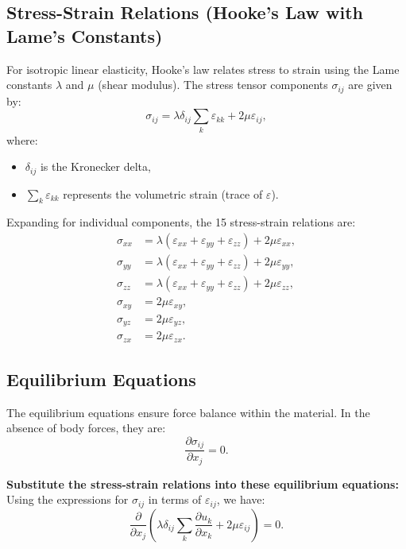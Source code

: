 \documentclass[fleqn,10pt]{olplainarticle}
\begin{document}
\subsection{Stress-Strain Relations (Hooke’s Law with Lame’s Constants)}
For isotropic linear elasticity, Hooke's law relates stress to strain using the Lame constants \(\lambda\) and \(\mu\) (shear modulus). The stress tensor components \(\sigma_{ij}\) are given by:
\begin{equation}
\sigma_{ij} = \lambda \delta_{ij} \sum_{k} \varepsilon_{kk} + 2 \mu \varepsilon_{ij},
\end{equation}
where:
\begin{itemize}
    \item \(\delta_{ij}\) is the Kronecker delta,
    \item \(\sum_{k} \varepsilon_{kk}\) represents the volumetric strain (trace of \(\varepsilon\)).
\end{itemize}

Expanding for individual components, the 15 stress-strain relations are:
\begin{align}
\sigma_{xx} &= \lambda (\varepsilon_{xx} + \varepsilon_{yy} + \varepsilon_{zz}) + 2 \mu \varepsilon_{xx}, \\
\sigma_{yy} &= \lambda (\varepsilon_{xx} + \varepsilon_{yy} + \varepsilon_{zz}) + 2 \mu \varepsilon_{yy}, \\
\sigma_{zz} &= \lambda (\varepsilon_{xx} + \varepsilon_{yy} + \varepsilon_{zz}) + 2 \mu \varepsilon_{zz}, \\
\sigma_{xy} &= 2 \mu \varepsilon_{xy}, \\
\sigma_{yz} &= 2 \mu \varepsilon_{yz}, \\
\sigma_{zx} &= 2 \mu \varepsilon_{zx}.
\end{align}

\subsection{Equilibrium Equations}
The equilibrium equations ensure force balance within the material. In the absence of body forces, they are:
\begin{equation}
\frac{\partial \sigma_{ij}}{\partial x_j} = 0.
\end{equation}

\textbf{Substitute the stress-strain relations into these equilibrium equations:} Using the expressions for \(\sigma_{ij}\) in terms of \(\varepsilon_{ij}\), we have:
\begin{equation}
\frac{\partial}{\partial x_j} \left( \lambda \delta_{ij} \sum_{k} \frac{\partial u_k}{\partial x_k} + 2 \mu \varepsilon_{ij} \right) = 0.
\end{equation}
\end{document}
